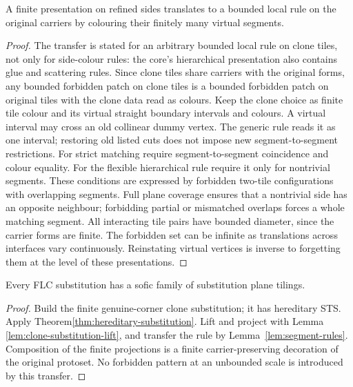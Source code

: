 \begin{lemma}
\label{lem:segment-rules}
A finite presentation on refined sides translates to a bounded local rule
on the original carriers by colouring their finitely many virtual segments.
\end{lemma}
\begin{proof}
The transfer is stated for an arbitrary bounded local rule on clone tiles,
not only for side-colour rules: the core's hierarchical presentation also
contains glue and scattering rules. Since clone tiles share carriers with
the original forms, any bounded forbidden patch on clone tiles is a
bounded forbidden patch on original tiles with the clone data read as
colours. Keep the clone choice as finite tile colour and its virtual straight
boundary intervals and colours. A virtual interval may cross an old
collinear dummy vertex. The generic rule reads it as one interval; restoring
old listed cuts does not impose new segment-to-segment restrictions.
For strict matching require segment-to-segment coincidence and colour
equality. For the flexible hierarchical rule require it only for
nontrivial segments. These conditions are expressed by forbidden
two-tile configurations with overlapping segments. Full plane coverage
ensures that a nontrivial side has an opposite neighbour; forbidding
partial or mismatched overlaps forces a whole matching segment.
All interacting tile pairs have bounded diameter, since the carrier forms
are finite. The forbidden set can be infinite as translations across
interfaces vary continuously. Reinstating virtual vertices is inverse to
forgetting them at the level of these presentations.
\end{proof}

\begin{theorem}\label{thm:flc-substitution}
Every FLC substitution has a sofic family of substitution plane tilings.
\end{theorem}
\begin{proof}
Build the finite genuine-corner clone substitution; it has hereditary STS.
Apply Theorem\ref{thm:hereditary-substitution}. Lift and project with Lemma
\ref{lem:clone-substitution-lift}, and transfer the rule by
Lemma~\ref{lem:segment-rules}. Composition of the finite projections is
a finite carrier-preserving decoration of the original protoset.
No forbidden pattern at an unbounded scale is introduced by this transfer.
\end{proof}

